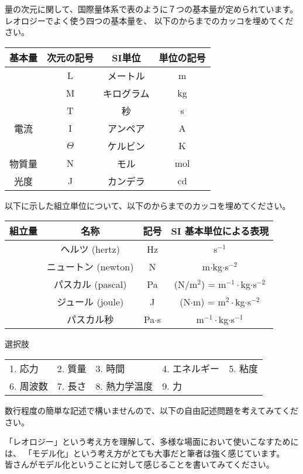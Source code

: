 \documentclass[uplatex,dvipdfmx,a4paper,11pt]{jsreport}
\begin{document}
\begin{qlist}
  \qitem 量の次元に関して、国際量体系で表のように７つの基本量が定められています。レオロジーでよく使う四つの基本量を、
  以下のからまでのカッコを埋めてください。
	\begin{center}
		\begin{tabular}{|c|c||c|c|} \hline
			基本量 		& 次元の記号 & SI単位 		& 単位の記号\\ \hline \hline
			\qbox{}		& L			& メートル 		& m \\ \hline
			\qbox{}		& M			& キログラム 	& kg \\ \hline
			\qbox{}		& T			& 秒 			& s \\ \hline
			電流		& I			& アンペア 		& A \\ \hline
			\qbox{}	& $\Theta$	& ケルビン 		& K \\ \hline
			物質量		& N			& モル 			& mol \\ \hline
			光度		& J			& カンデラ 		& cd \\ \hline
		\end{tabular}
	\end{center}

	\qitem 以下に示した組立単位について、以下のからまでのカッコを埋めてください。
	\begin{center}
		\begin{tabular}{|c|c||c|c|} \hline
			組立量 		& 名称					& 記号		& SI 基本単位による表現 	\\ \hline \hline
			\qbox{}		& ヘルツ (hertz)		& Hz		&  s$^{-1}$ 					\\ \hline
			\qbox{}		& ニュートン (newton)	& N 		& m$\cdot$kg$\cdot$s$^{-2}$ 	\\ \hline
			\qbox{}		& パスカル (pascal)		& Pa 		& (N/m$^2$) = m$^{-1}\cdot$kg$\cdot$s$^{-2}$ \\ \hline
			\qbox{}	& ジュール (joule)		& J 		& (N$\cdot$m) = m$^{2}\cdot$kg$\cdot$s$^{-2}$ \\ \hline
			\qbox{}		& パスカル秒			& Pa$\cdot$s & m$^{-1}\cdot$kg$\cdot$s$^{-1}$ \\ \hline
		\end{tabular}
  \end{center}
  
  \begin{itembox}[l]{選択肢}
    \begin{center}
      \begin{tabular}{lllll}
        1. 応力&2. 質量&3. 時間&4. エネルギー&5. 粘度\\
        6. 周波数&7. 長さ&8. 熱力学温度&9. 力
      \end{tabular}
    \end{center}
  \end{itembox}
\end{qlist}

数行程度の簡単な記述で構いませんので、以下の自由記述問題を考えてみてください。
\begin{qlist}
\qitem 「レオロジー」という考え方を理解して、多様な場面において使いこなすためには、
「モデル化」という考え方がとても大事だと筆者は強く感じています。\\
皆さんがモデル化ということに対して感じることを書いてみてください。
\end{qlist}
\end{document}
